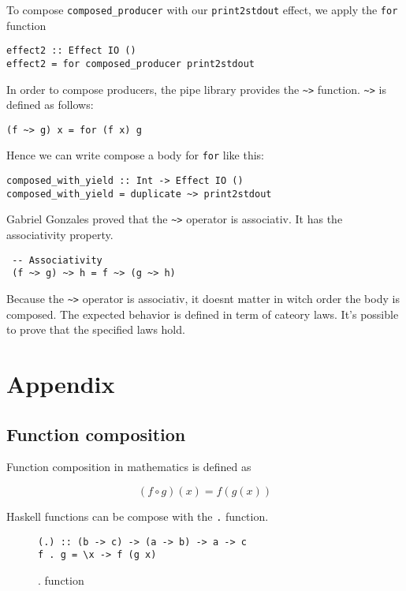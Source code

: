 \documentclass[twoside, a4paper]{article}
\begin{document}
To compose \verb|composed_producer| with our \verb|print2stdout| effect, we apply the \verb|for| function

\begin{verbatim}
effect2 :: Effect IO ()
effect2 = for composed_producer print2stdout
\end{verbatim}

In order to compose producers, the pipe library provides the \verb|~>| function. \verb|~>| is defined as follows:
\begin{verbatim}
(f ~> g) x = for (f x) g
\end{verbatim}

Hence we can write compose a body for \verb|for| like this:
\begin{verbatim}
composed_with_yield :: Int -> Effect IO ()
composed_with_yield = duplicate ~> print2stdout
\end{verbatim}

Gabriel Gonzales proved that the \verb|~>| operator is associativ. It has the associativity property.

\begin{verbatim}
 -- Associativity
 (f ~> g) ~> h = f ~> (g ~> h)
\end{verbatim}

Because the \verb|~>| operator is associativ, it doesnt matter in witch order the body is composed. The expected behavior is defined in term of cateory laws. It's possible to prove that the specified laws hold.

\section{Appendix}
\label{sec:appendix}


\subsection{Function composition}

\label{sec:functioncomposition}

Function composition in mathematics is defined as

\begin{equation}
  \label{eq:functioncomposition}
  (f \circ g)(x) = f(g(x))
\end{equation}

Haskell functions can be compose with the \verb|.| function.

\begin{figure}
  \centering
\begin{verbatim}
(.) :: (b -> c) -> (a -> b) -> a -> c
f . g = \x -> f (g x)
\end{verbatim}
  \caption{. function}
  \label{fig:compositionfunction}
\end{figure}
\end{document}
